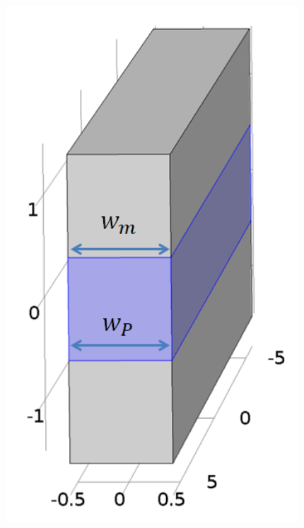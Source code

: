 \documentclass[compress]{beamer}
\begin{document}
\begin{frame}
{\begin{columns}[totalwidth=\textwidth]
\begin{column}{.19\textwidth}
 \includegraphics[width=0.99\textwidth]{Graphic/03_geo_B}
 \end{column}
 \begin{column}{.35\textwidth}

\end{column}
\end{columns}}
\end{frame}
\end{document}
